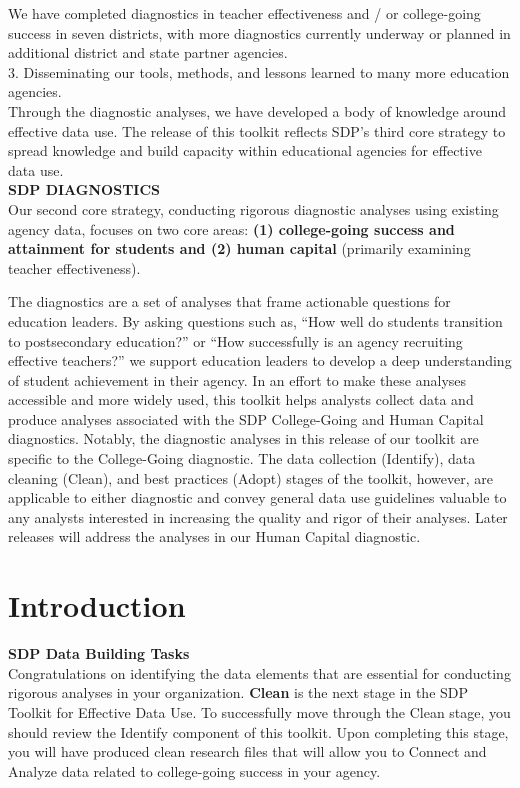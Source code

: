 \documentclass[12pt]{article}
\begin{document}
{\small We have completed diagnostics in teacher effectiveness and / or college-going success in 
seven districts, with more diagnostics currently underway or planned in additional district 
and state partner agencies.} \\

3. Disseminating our tools, methods, and lessons learned to many more education agencies. \\

{\small Through the diagnostic analyses, we have developed a body of knowledge around effective 
data use.  The release of this toolkit reflects SDP's third core strategy to spread knowledge 
and build capacity within educational agencies for effective data use.} \\


\textbf{SDP DIAGNOSTICS}\\

\noindent Our second core strategy, conducting rigorous diagnostic analyses using existing agency data, focuses on two core areas: \textbf{(1) college-going
success and attainment for students and (2) human capital} (primarily examining teacher effectiveness).

The diagnostics are a set of analyses that frame actionable questions for education leaders.  By asking questions such as, ``How well do students transition to postsecondary education?'' or ``How successfully is an agency recruiting effective teachers?'' we support education leaders to develop a deep understanding of student achievement in their agency. In an effort to make these analyses accessible and more widely used, this toolkit helps analysts collect data and produce analyses associated with the SDP College-Going and Human Capital diagnostics.  Notably, the diagnostic analyses in this release of our toolkit are specific to the 
College-Going diagnostic.  The data collection (Identify), data cleaning (Clean), and best practices (Adopt) stages of the toolkit, however, are 
applicable to either diagnostic and convey general data use guidelines valuable to any analysts interested in increasing the quality and rigor of 
their analyses. Later releases will address the analyses in our Human Capital diagnostic.

\section{Introduction}
\noindent \Large \textbf{SDP Data Building Tasks} \\
\normalsize
Congratulations on identifying the data elements that are essential for conducting rigorous analyses in your 
organization. \textbf{Clean} is the next stage in the SDP Toolkit for Effective Data Use.  To successfully move through the 
Clean stage, you should review the  Identify component of this toolkit.  Upon completing this stage, you will have 
produced clean research files that will allow you to Connect and Analyze data related to college-going success in your 
agency.  \\
\end{document}
